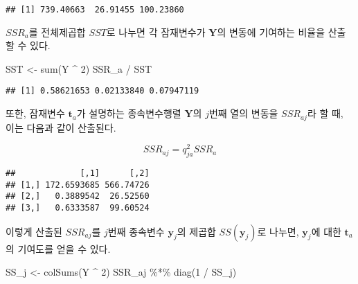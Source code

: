 \documentclass[
]{book}
\newenvironment{Shaded}{\begin{snugshade}}{\end{snugshade}}
\newcommand{\DecValTok}[1]{\textcolor[rgb]{0.00,0.00,0.81}{#1}}
\newcommand{\FunctionTok}[1]{\textcolor[rgb]{0.00,0.00,0.00}{#1}}
\newcommand{\NormalTok}[1]{#1}
\newcommand{\OtherTok}[1]{\textcolor[rgb]{0.56,0.35,0.01}{#1}}
\newcommand{\SpecialCharTok}[1]{\textcolor[rgb]{0.00,0.00,0.00}{#1}}
\begin{document}
\begin{verbatim}
## [1] 739.40663  26.91455 100.23860
\end{verbatim}

\(SSR_a\)를 전체제곱합 \(SST\)로 나누면 각 잠재변수가 \(\mathbf{Y}\)의 변동에 기여하는 비율을 산출할 수 있다.

\begin{Shaded}
\begin{Highlighting}[]
\NormalTok{SST }\OtherTok{\textless{}{-}} \FunctionTok{sum}\NormalTok{(Y }\SpecialCharTok{\^{}} \DecValTok{2}\NormalTok{)}
\NormalTok{SSR\_a }\SpecialCharTok{/}\NormalTok{ SST}
\end{Highlighting}
\end{Shaded}

\begin{verbatim}
## [1] 0.58621653 0.02133840 0.07947119
\end{verbatim}

또한, 잠재변수 \(\mathbf{t}_a\)가 설명하는 종속변수행렬 \(\mathbf{Y}\)의 \(j\)번째 열의 변동을 \(SSR_{aj}\)라 할 때, 이는 다음과 같이 산출된다.

\begin{equation}
SSR_{aj} = q_{ja}^2 SSR_a
\end{equation}

\begin{Shaded}
\end{Shaded}

\begin{verbatim}
##             [,1]      [,2]
## [1,] 172.6593685 566.74726
## [2,]   0.3889542  26.52560
## [3,]   0.6333587  99.60524
\end{verbatim}

이렇게 산출된 \(SSR_{aj}\)를 \(j\)번째 종속변수 \(\mathbf{y}_j\)의 제곱합 \(SS(\mathbf{y}_j)\)로 나누면, \(\mathbf{y}_j\)에 대한 \(\mathbf{t}_a\)의 기여도를 얻을 수 있다.

\begin{Shaded}
\begin{Highlighting}[]
\NormalTok{SS\_j }\OtherTok{\textless{}{-}} \FunctionTok{colSums}\NormalTok{(Y }\SpecialCharTok{\^{}} \DecValTok{2}\NormalTok{)}
\NormalTok{SSR\_aj }\SpecialCharTok{\%*\%} \FunctionTok{diag}\NormalTok{(}\DecValTok{1} \SpecialCharTok{/}\NormalTok{ SS\_j)}
\end{Highlighting}
\end{Shaded}
\end{document}
